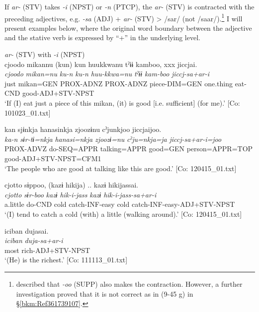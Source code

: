 If \textit{ar-} (STV) takes \textit{{}-i} (NPST) or \textit{{}-n} (PTCP), the \textit{ar-} (STV) is contracted with the preceding adjectives, e.g. \textit{{}-sa} (ADJ) + \textit{ar-} (STV) > /sar/ (not /saar/).\footnote{\citet[71]{Niinaga2010} described that \textit{{}-oo} (SUPP) also makes the contraction. However, a further investigation proved that it is not correct as in (9-45 g) in §\ref{bkm:Ref361739107}.} I will present examples below, where the original word boundary between the adjective and the stative verb is expressed by “+” in the underlying level.

\ea   \textit{ar-} (STV) with \textit{{}-i} (NPST) \label{ex:9.46}
  \ea\relax [= (7-25 b)]\\
    \glll  {\textbar}cjoodo  mikan{\textbar}nu  (kun)  kun  huukkwanu   tˀɨɨ  kamboo,  xxx  jiccjai.\\
      \textit{cjoodo}  \textit{mikan=nu}  \textit{ku-n}  \textit{ku-n}  \textit{huu-kkwa=nu}   \textit{tˀɨɨ}  \textit{kam-boo}    \textit{jiccj-sa+ar-i}\\
      just  mikan=GEN  PROX-ADNZ  PROX-ADNZ  piece-DIM=GEN  one.thing  eat-CND    good-ADJ+STV-NPST\\
      \glt       ‘If (I) eat just a piece of this mikan, (it) is good [i.e. sufficient] (for me).’ [Co: 101023\_01.txt]

\ex \label{ex:9.46b} %
    \glll  kan  sjɨnkja  hanasinkja  zjoozɨnu cˀjunkjoo  jiccjaijoo.\\
      \textit{ka-n}  \textit{sɨr-tɨ=nkja}  \textit{hanasi=nkja}  \textit{zjoozɨ=nu}  \textit{cˀju=nkja=ja}  \textit{jiccj-sa+ar-i=joo}\\
      PROX-ADVZ  do-SEQ=APPR  talking=APPR  good=GEN   person=APPR=TOP  good-ADJ+STV-NPST=CFM1\\
      \glt       ‘The people who are good at talking like this are good.’ [Co: 120415\_01.txt]

\ex \label{ex:9.46c} %
    \glll  {\textbar}cjotto{\textbar}  sɨppoo,  (kazɨ  hikija)  ..  kazɨ  hikijassai.\\
      \textit{cjotto}  \textit{sɨr-boo}  \textit{kazɨ}  \textit{hik-i-jass}    \textit{kazɨ} \textit{hik-i-jass-sa+ar-i}\\
      a.little  do-CND  cold  catch-INF-easy    cold  catch-INF-easy-ADJ+STV-NPST\\
      \glt       ‘(I) tend to catch a cold (with) a little (walking around).’ [Co: 120415\_01.txt]

\ex \label{ex:9.46d} %
 \glll  {\textbar}iciban{\textbar}  dujasai.\\
      \textit{iciban}  \textit{duja-sa+ar-i}\\
      most  rich-ADJ+STV-NPST\\
      \glt       ‘(He) is the richest.’ [Co: 111113\_01.txt]

